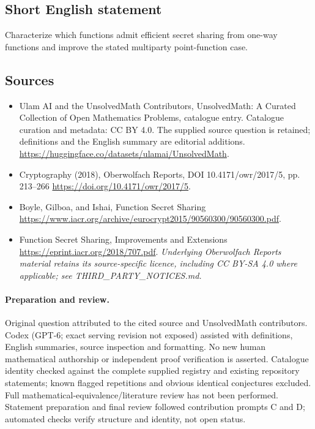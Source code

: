 \documentclass[11pt]{article}
\begin{document}
\subsection{Short English statement}
Characterize which functions admit efficient secret sharing from one-way functions and improve the stated multiparty point-function case.
\subsection{Sources}
\begin{itemize}
\item[\hypertarget{source:statement:1}{S1}] Ulam AI and the UnsolvedMath Contributors, UnsolvedMath: A Curated Collection of Open Mathematics Problems, catalogue entry. Catalogue curation and metadata: CC BY 4.0. The supplied source question is retained; definitions and the English summary are editorial additions.
\url{https://huggingface.co/datasets/ulamai/UnsolvedMath}.
\item[\hypertarget{source:statement:2}{S2}] Cryptography (2018), Oberwolfach Reports, DOI 10.4171/owr/2017/5, pp. 213--266
\url{https://doi.org/10.4171/owr/2017/5}.
\item[\hypertarget{source:statement:3}{S3}] Boyle, Gilboa, and Ishai, Function Secret Sharing
\url{https://www.iacr.org/archive/eurocrypt2015/90560300/90560300.pdf}.
\item[\hypertarget{source:statement:4}{S4}] Function Secret Sharing, Improvements and Extensions
\url{https://eprint.iacr.org/2018/707.pdf}.
\textit{Underlying Oberwolfach Reports material retains its source-specific licence, including CC BY-SA 4.0 where applicable; see THIRD\_PARTY\_NOTICES.md.}
\end{itemize}
\paragraph{Preparation and review.}
Original question attributed to the cited source and UnsolvedMath contributors. Codex (GPT-6; exact serving revision not exposed) assisted with definitions, English summaries, source inspection and formatting. No new human mathematical authorship or independent proof verification is asserted. Catalogue identity checked against the complete supplied registry and existing repository statements; known flagged repetitions and obvious identical conjectures excluded. Full mathematical-equivalence/literature review has not been performed. Statement preparation and final review followed contribution prompts C and D; automated checks verify structure and identity, not open status.
\label{end:statement}
\end{document}
